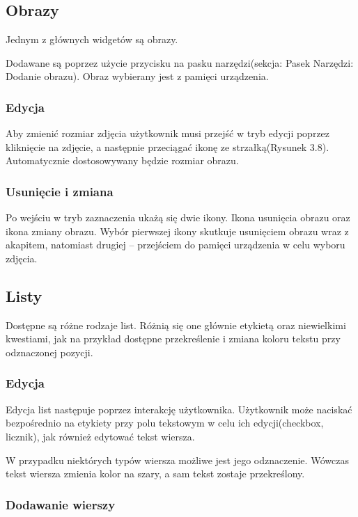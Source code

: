 \subsection{Obrazy}

Jednym z głównych widgetów są obrazy. 

Dodawane są poprzez użycie przycisku na pasku narzędzi(sekcja: Pasek Narzędzi: Dodanie obrazu). Obraz wybierany jest z pamięci urządzenia.

\subsubsection{Edycja}

Aby zmienić rozmiar zdjęcia użytkownik musi przejść w tryb edycji poprzez kliknięcie na zdjęcie, a następnie przeciągać ikonę ze strzałką(Rysunek 3.8). Automatycznie dostosowywany będzie rozmiar obrazu.

\subsubsection{Usunięcie i zmiana}

Po wejściu w tryb zaznaczenia ukażą się dwie ikony. Ikona usunięcia obrazu oraz ikona zmiany obrazu.
Wybór pierwszej ikony skutkuje usunięciem obrazu wraz z akapitem, natomiast drugiej -- przejściem do pamięci urządzenia w celu wyboru zdjęcia.

\subsection{Listy}

Dostępne są różne rodzaje list. Różnią się one głównie etykietą oraz niewielkimi kwestiami, jak na przykład dostępne przekreślenie i zmiana koloru tekstu przy odznaczonej pozycji.

\subsubsection{Edycja}

Edycja list następuje poprzez interakcję użytkownika. Użytkownik może naciskać bezpośrednio na etykiety przy polu tekstowym w celu ich edycji(checkbox, licznik), jak również edytować tekst wiersza.

W przypadku niektórych typów wiersza możliwe jest jego odznaczenie. Wówczas tekst wiersza zmienia kolor na szary, a sam tekst zostaje przekreślony.

\subsubsection{Dodawanie wierszy}

